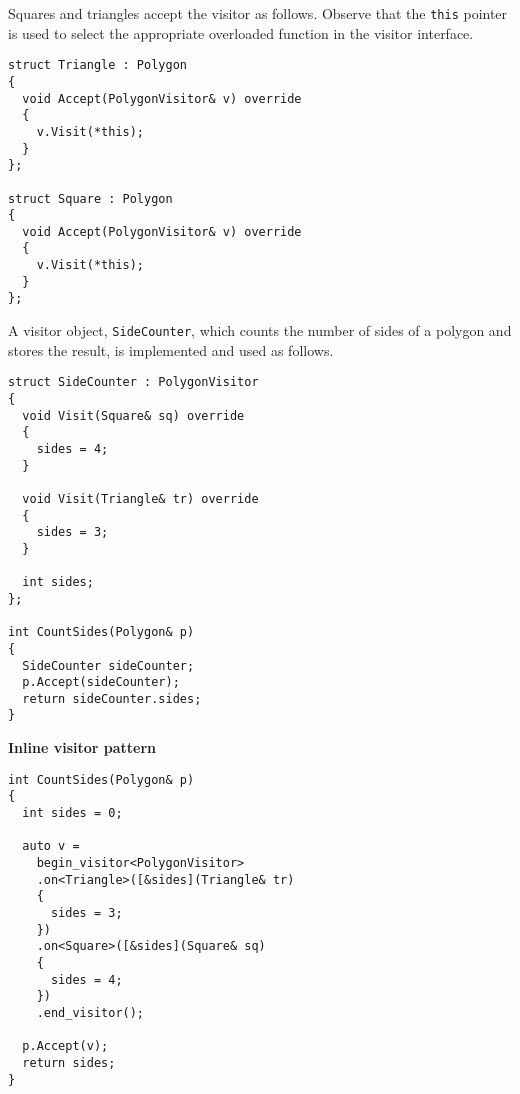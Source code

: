 \documentclass[10pt,a4paper,twocolumn]{article}
\renewcommand\section[1]{
    \begin{minipage}[c]{0.94\linewidth}
    \large \raggedright \sffamily \textbf{#1}
    \end{minipage}
}
\newcommand\mycode[1]{{\small\texttt{#1}}}
\begin{document}
Squares and triangles accept the visitor as follows. Observe that the \mycode{this} pointer is used to select the appropriate overloaded function in the visitor interface.

{\small\begin{verbatim}
struct Triangle : Polygon
{
  void Accept(PolygonVisitor& v) override
  {
    v.Visit(*this);
  }
};

struct Square : Polygon
{
  void Accept(PolygonVisitor& v) override
  {
    v.Visit(*this);
  }
};
\end{verbatim}}

A visitor object, \mycode{SideCounter}, which counts the number of sides of a polygon and stores the result, is implemented and used as follows.

{\small\begin{verbatim}
struct SideCounter : PolygonVisitor
{
  void Visit(Square& sq) override
  {
    sides = 4;
  }
  
  void Visit(Triangle& tr) override
  {
    sides = 3;
  }
  
  int sides;
};

int CountSides(Polygon& p)
{
  SideCounter sideCounter;
  p.Accept(sideCounter);
  return sideCounter.sides;
}
\end{verbatim}}

\section{Inline visitor pattern}

{\small\begin{verbatim}
int CountSides(Polygon& p)
{
  int sides = 0;
  
  auto v =
    begin_visitor<PolygonVisitor>
    .on<Triangle>([&sides](Triangle& tr)
    {
      sides = 3;
    })
    .on<Square>([&sides](Square& sq)
    {
      sides = 4;
    })
    .end_visitor();
  
  p.Accept(v);
  return sides;
}
\end{verbatim}}

%
%
%
\end{document}
